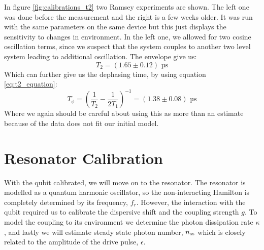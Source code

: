 In figure \ref{fig:calibrations_t2} two Ramsey experiments are shown. The left one was done before the measurement and the right is a few weeks older. It was run with the same parameters on the same device but this just displays the sensitivity to changes in environment. In the left one, we allowed for two cosine oscillation terms, since we suspect that the system couples to another two level system leading to additional oscillation. The envelope give us:
\begin{equation}
    T_2 = (1.65 \pm 0.12) \text{ µs} 
\end{equation}
Which can further give us the dephasing time, by using equation \ref{eq:t2_equation}:
\begin{equation}
    T_\phi = \left(\frac{1}{T_2} - \frac{1}{2T_1} \right)^{-1} = (1.38 \pm 0.08) \text{ µs}
\end{equation}
Where we again should be careful about using this as more than an estimate because of the data does not fit our initial model. 




\section{Resonator Calibration}
With the qubit calibrated, we will move on to the resonator. The resonator is modelled as a quantum harmonic oscillator, so the non-interacting Hamilton is completely determined by its frequency, $f_r$. However, the interaction with the qubit required us to calibrate the dispersive shift and the coupling strength $g$. To model the coupling to its environment we determine the photon dissipation rate $\kappa$,  and lastly we will estimate steady state photon number, $\Bar{n}_{\text{ss}}$ which is closely related to the amplitude of the drive pulse, $\epsilon$.

